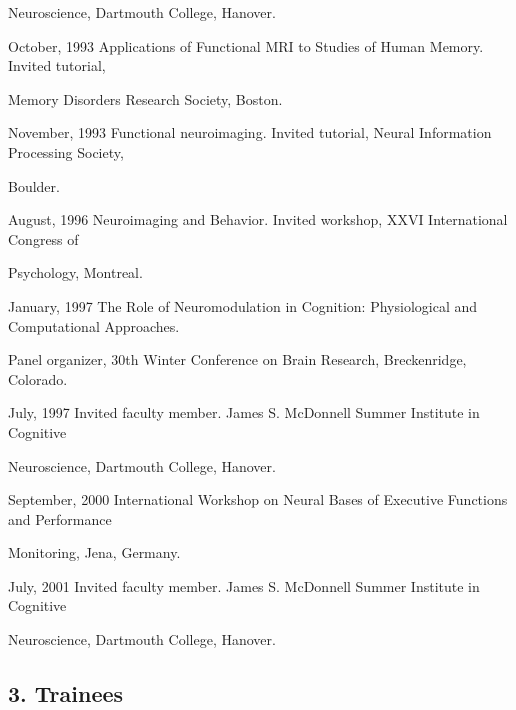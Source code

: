 \documentclass[10 pt]{article}
\begin{document}
\hspace{1.1in} Neuroscience, Dartmouth College, Hanover.

October, 1993 \hspace{0.2in} Applications of Functional MRI to Studies of Human Memory. Invited tutorial,

\hspace{1.1in} Memory Disorders Research Society, Boston.

November, 1993 \hspace{0.09in} Functional neuroimaging. Invited tutorial, Neural Information Processing Society,

\hspace{1.1in} Boulder.

August, 1996 \hspace{0.25in} Neuroimaging and Behavior. Invited workshop, XXVI International Congress of

\hspace{1.1in} Psychology, Montreal.

January, 1997 \hspace{0.23in} The Role of Neuromodulation in Cognition: Physiological and Computational Approaches.

\hspace{1.1in} Panel organizer, 30th Winter Conference on Brain Research, Breckenridge, Colorado.

July, 1997 \hspace{0.44in} Invited faculty member. James S. McDonnell Summer Institute in Cognitive

\hspace{1.1in} Neuroscience, Dartmouth College, Hanover.

September, 2000 \hspace{0.05in} International Workshop on Neural Bases of Executive Functions and Performance

\hspace{1.1in} Monitoring, Jena, Germany.

July, 2001 \hspace{0.44in} Invited faculty member. James S. McDonnell Summer Institute in Cognitive

\hspace{1.1in} Neuroscience, Dartmouth College, Hanover.
    \smallskip

\subsection*{3. Trainees} \label{secTEACHING3}
    \smallskip
\end{document}
